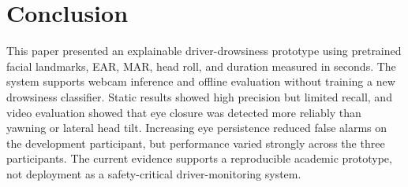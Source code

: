 \documentclass[runningheads]{llncs}
\begin{document}
\section{Conclusion}

This paper presented an explainable driver-drowsiness prototype using pretrained
facial landmarks, EAR, MAR, head roll, and duration measured in seconds. The
system supports webcam inference and offline evaluation without training a new
drowsiness classifier. Static results showed high precision but limited recall,
and video evaluation showed that eye closure was detected more reliably than
yawning or lateral head tilt. Increasing eye persistence reduced false alarms on
the development participant, but performance varied strongly across the three
participants. The current evidence supports a reproducible academic prototype,
not deployment as a safety-critical driver-monitoring system.




\end{document}
